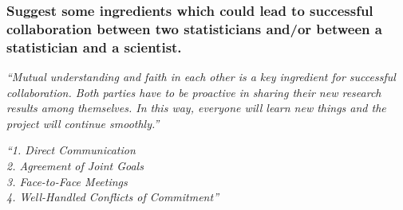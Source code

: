 \documentclass[12pt]{beamer}
\newcommand\ans[1]{{\it ``#1''}}
\newcommand\gap{\vspace{5mm}}
\begin{document}
\begin{frame}








\end{frame} 

\begin{frame} %
\frametitle{Suggest some ingredients which could lead to successful collaboration between two statisticians and/or between a statistician and a scientist.}



\ans{Mutual understanding and faith in each other is a key ingredient for successful collaboration.  Both parties have to be proactive in sharing their new research results among themselves.  In this way, everyone will learn new things and the project will continue smoothly.}

\gap

\ans{1.  Direct Communication\\
  2.  Agreement of Joint Goals\\
  3.  Face-to-Face Meetings\\
  4.  Well-Handled Conflicts of Commitment}

\end{frame}
\end{document}
